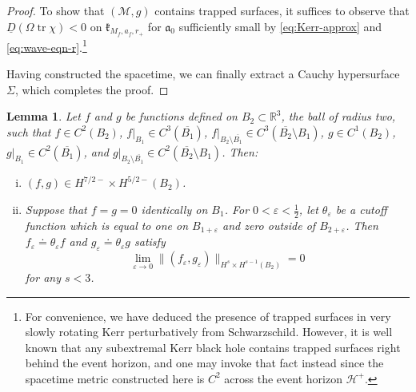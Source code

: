 \documentclass[10pt]{article}
\numberwithin{equation}{section}
\theoremstyle{plain}
\newtheorem{lem}{Lemma}[section]
\theoremstyle{definition}
\renewcommand{\Bbb}{\mathbb}
\newcommand{\ve}{\varepsilon}
\newcommand{\tr}{\operatorname{tr}}
\begin{document}
\begin{proof}
To show that $(\mathcal M,g)$ contains trapped surfaces, it suffices to observe that 
$\underline D(\Omega\tr\chi)<0$ on $\mathfrak k_{M_f,a_f,r_+}$ for $\mathfrak a_0$ sufficiently small by \eqref{eq:Kerr-approx} and \eqref{eq:wave-eqn-r}.\footnote{For convenience, we have deduced the presence of trapped surfaces in very slowly rotating Kerr perturbatively from Schwarzschild. However, it is well known that any subextremal Kerr black hole contains trapped surfaces right behind the event horizon, and one may invoke that fact instead since the spacetime metric constructed here is $C^2$ across the event horizon $\mathcal H^+$.}

Having constructed the spacetime, we can finally extract a Cauchy hypersurface $\Sigma$, which completes the proof.   \end{proof}


\begin{lem}\label{lem:Sob}
 Let $f$ and $g$ be functions defined on $B_2\subset \Bbb R^3$, the ball of radius two, such that $f\in C^2(B_2)$, $f|_{B_1}\in C^3(\overline{B_1})$, $f|_{B_2\setminus\overline{B_1}}\in C^3(\overline{B_2}\setminus B_1)$, $g\in C^1(B_2)$, $g|_{B_1}\in C^2(\overline{B_1})$, and $g|_{B_2\setminus\overline{B_1}}\in C^2(\overline{B_2}\setminus B_1)$. Then:
 \begin{enumerate}[(i)]
     \item  $(f,g)\in H^{7/2-}\times H^{5/2-}(B_2)$.
     \item Suppose that $f=g=0$ identically on $B_1$. For $0<\ve<\tfrac 12$, let $\theta_\ve$ be a cutoff function which is equal to one on $B_{1+\ve}$ and zero outside of $B_{2+\ve}$. Then $f_\ve\doteq \theta_\ve f$ and $g_\ve\doteq \theta_\ve g$ satisfy 
   \begin{equation}
       \lim_{\ve\to 0}\|(f_\ve,g_\ve)\|_{H^s\times H^{s-1}(B_2)}=0\label{eq:Sob-1}
   \end{equation}
   for any $s<3$. 
 \end{enumerate}
\end{lem}
\end{document}
